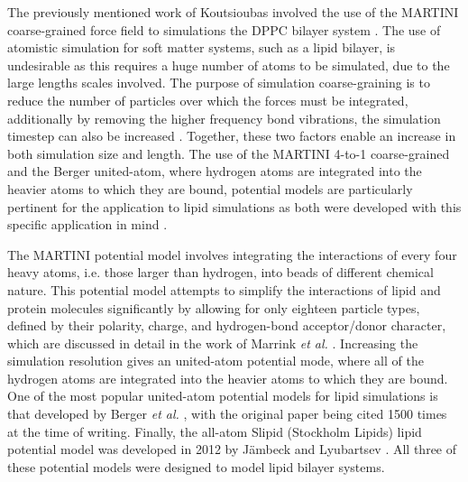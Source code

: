 \documentclass[amsmath,amssymb,twocolumn,superscriptaddress]{revtex4-1}
\begin{document}
The previously mentioned work of Koutsioubas involved the use of the MARTINI coarse-grained force field to simulations the DPPC bilayer system \cite{koutsioubas_combined_2016}.
The use of atomistic simulation for soft matter systems, such as a lipid bilayer, is undesirable as this requires a huge number of atoms to be simulated, due to the large lengths scales involved.
The purpose of simulation coarse-graining is to reduce the number of particles over which the forces must be integrated, additionally by removing the higher frequency bond vibrations, the simulation timestep can also be increased \cite{pluhackova_biomembranes_2015}.
Together, these two factors enable an increase in both simulation size and length.
The use of the MARTINI 4-to-1 coarse-grained and the Berger united-atom, where hydrogen atoms are integrated into the heavier atoms to which they are bound, potential models are particularly pertinent for the application to lipid simulations as both were developed with this specific application in mind \cite{marrink_martini_2007,berger_molecular_1997}.

The MARTINI potential model involves integrating the interactions of every four heavy atoms, i.e. those larger than hydrogen, into beads of different chemical nature.
This potential model attempts to simplify the interactions of lipid and protein molecules significantly by allowing for only eighteen particle types, defined by their polarity, charge, and hydrogen-bond acceptor/donor character, which are discussed in detail in the work of Marrink \emph{et al.} \cite{marrink_martini_2007}.
Increasing the simulation resolution gives an united-atom potential mode, where all of the hydrogen atoms are integrated into the heavier atoms to which they are bound.
One of the most popular united-atom potential models for lipid simulations is that developed by Berger \emph{et al.} \cite{berger_molecular_1997}, with the original paper being cited 1500 times at the time of writing.
Finally, the all-atom Slipid (Stockholm Lipids) lipid potential model was developed in 2012 by J\"{a}mbeck and Lyubartsev \cite{jambeck_derivation_2012}.
All three of these potential models were designed to model lipid bilayer systems.
\end{document}
